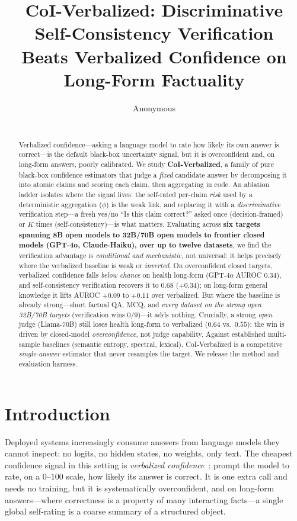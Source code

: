 \documentclass[11pt]{article}
\title{CoI-Verbalized: Discriminative Self-Consistency Verification \\
Beats Verbalized Confidence on Long-Form Factuality}
\author{Anonymous \\ \texttt{} \\}
\begin{document}
\maketitle

\begin{abstract}
Verbalized confidence---asking a language model to rate how likely its own answer is
correct---is the default black-box uncertainty signal, but it is overconfident and, on
long-form answers, poorly calibrated. We study \textbf{CoI-Verbalized}, a family of
pure black-box confidence estimators that judge a \emph{fixed} candidate answer by
decomposing it into atomic claims and scoring each claim, then aggregating in code. An
ablation ladder isolates where the signal lives: the self-rated per-claim \emph{risk} used
by a deterministic aggregation ($\phi$) is the weak link, and replacing it with a
\emph{discriminative} verification step---a fresh yes/no ``Is this claim correct?'' asked
once (decision-framed) or $K$ times (self-consistency)---is what matters. Evaluating across
\textbf{six targets spanning 8B open models to 32B/70B open models to frontier closed models
(GPT-4o, Claude-Haiku), over up to twelve datasets}, we find the verification advantage is
\emph{conditional and mechanistic}, not universal: it helps precisely where the verbalized
baseline is weak or \emph{inverted}. On overconfident closed targets, verbalized confidence
falls \emph{below chance} on health long-form (GPT-4o AUROC $0.34$), and self-consistency
verification recovers it to $0.68$ ($+0.34$); on long-form general knowledge it lifts AUROC
$+0.09$ to $+0.11$ over verbalized. But where the baseline is already strong---short factual
QA, MCQ, and \emph{every dataset on the strong open 32B/70B targets} (verification wins
$0/9$)---it adds nothing. Crucially, a strong \emph{open} judge (Llama-70B) still loses health
long-form to verbalized ($0.64$ vs.\ $0.55$): the win is driven by closed-model
\emph{overconfidence}, not judge capability. Against established multi-sample baselines
(semantic entropy, spectral, lexical), CoI-Verbalized is a competitive \emph{single-answer}
estimator that never resamples the target. We release the method and evaluation harness.
\end{abstract}

\section{Introduction}
Deployed systems increasingly consume answers from language models they cannot inspect:
no logits, no hidden states, no weights, only text. The cheapest confidence signal in
this setting is \emph{verbalized confidence}~\citep{tian2023just,kadavath2022language}:
prompt the model to rate, on a $0$--$100$ scale, how likely its answer is correct. It is
one extra call and needs no training, but it is systematically overconfident, and on
long-form answers---where correctness is a property of many interacting facts---a single
global self-rating is a coarse summary of a structured object.
\end{document}
